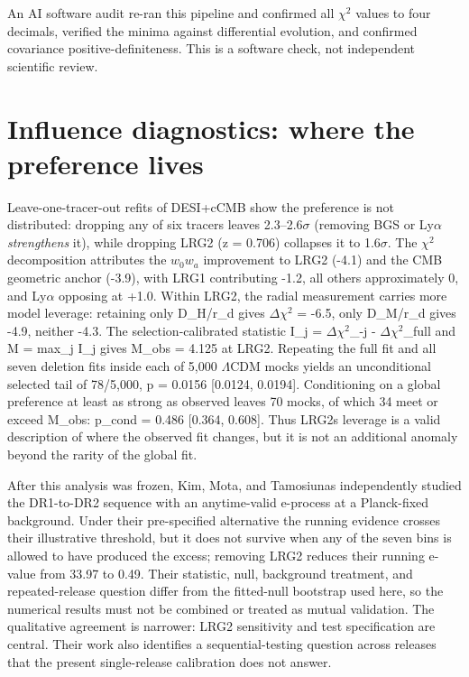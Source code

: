 \documentclass[aps,prd,preprint,superscriptaddress,nofootinbib]{revtex4-2}
\begin{document}
An AI software audit re-ran this pipeline and confirmed all \(\chi^2\)
values to four decimals, verified the minima against differential
evolution, and confirmed covariance positive-definiteness. This is a
software check, not independent scientific review.

\section{Influence diagnostics: where the preference
lives}\label{influence-diagnostics-where-the-preference-lives}

Leave-one-tracer-out refits of DESI+cCMB show the preference is not
distributed: dropping any of six tracers leaves 2.3--2.6\(\sigma\)
(removing BGS or Ly\(\alpha\) \emph{strengthens} it), while dropping
LRG2 (z = 0.706) collapses it to 1.6\(\sigma\). The \(\chi^2\)
decomposition attributes the \(w_0\)\(w_a\) improvement to LRG2 (-4.1)
and the CMB geometric anchor (-3.9), with LRG1 contributing -1.2, all
others approximately 0, and Ly\(\alpha\) opposing at +1.0. Within LRG2,
the radial measurement carries more model leverage: retaining only
D\_H/r\_d gives \(\Delta\chi^2\) = -6.5, only D\_M/r\_d gives -4.9,
neither -4.3. The selection-calibrated statistic I\_j =
\(\Delta\chi^2\)\_-j - \(\Delta\chi^2\)\_full and M = max\_j I\_j gives
M\_obs = 4.125 at LRG2. Repeating the full fit and all seven deletion
fits inside each of 5,000 \(\Lambda\)CDM mocks yields an unconditional
selected tail of 78/5,000, p = 0.0156 {[}0.0124, 0.0194{]}. Conditioning
on a global preference at least as strong as observed leaves 70 mocks,
of which 34 meet or exceed M\_obs: p\_cond = 0.486 {[}0.364, 0.608{]}.
Thus LRG2\textquotesingle s leverage is a valid description of where the
observed fit changes, but it is not an additional anomaly beyond the
rarity of the global fit.

After this analysis was frozen, Kim, Mota, and Tamosiunas independently
studied the DR1-to-DR2 sequence with an anytime-valid e-process at a
Planck-fixed background. Under their pre-specified alternative the
running evidence crosses their illustrative threshold, but it does not
survive when any of the seven bins is allowed to have produced the
excess; removing LRG2 reduces their running e-value from 33.97 to 0.49.
Their statistic, null, background treatment, and repeated-release
question differ from the fitted-null bootstrap used here, so the
numerical results must not be combined or treated as mutual validation.
The qualitative agreement is narrower: LRG2 sensitivity and test
specification are central. Their work also identifies a
sequential-testing question across releases that the present
single-release calibration does not answer.
\end{document}
